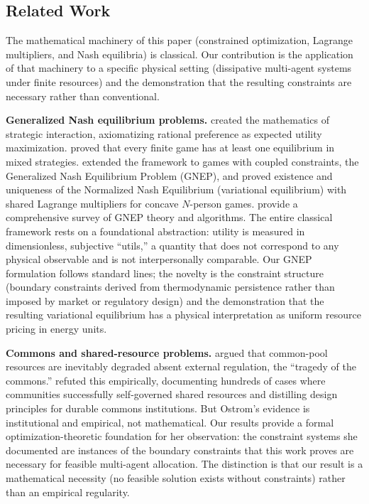 \documentclass[11pt]{article}
\theoremstyle{plain}
\theoremstyle{definition}
\theoremstyle{remark}
\let\origsubsection\subsection
\renewcommand{\subsection}{\needspace{7\baselineskip}\origsubsection}
\begin{document}
\subsection{Related Work}\label{related-work}

The mathematical machinery of this paper (constrained optimization,
Lagrange multipliers, and Nash equilibria) is classical. Our
contribution is the application of that machinery to a specific physical
setting (dissipative multi-agent systems under finite resources) and the
demonstration that the resulting constraints are necessary rather than
conventional.

\textbf{Generalized Nash equilibrium problems.} \citet{VonNeumann1944}
created the mathematics of strategic interaction, axiomatizing rational
preference as expected utility maximization. \citeauthor{Nash1950}
\citetext{\citeyear{Nash1950}; \citeyear{Nash1951}} proved that every
finite game has at least one equilibrium in mixed strategies.
\citet{Rosen1965} extended the framework to games with coupled
constraints, the Generalized Nash Equilibrium Problem (GNEP), and proved
existence and uniqueness of the Normalized Nash Equilibrium (variational
equilibrium) with shared Lagrange multipliers for concave \(N\)-person
games. \citet{Facchinei2010} provide a comprehensive survey of GNEP
theory and algorithms. The entire classical framework rests on a
foundational abstraction: utility is measured in dimensionless,
subjective ``utils,'' a quantity that does not correspond to any
physical observable and is not interpersonally comparable. Our GNEP
formulation follows standard lines; the novelty is the constraint
structure (boundary constraints derived from thermodynamic persistence
rather than imposed by market or regulatory design) and the
demonstration that the resulting variational equilibrium has a physical
interpretation as uniform resource pricing in energy units.

\textbf{Commons and shared-resource problems.} \citet{Hardin1968} argued
that common-pool resources are inevitably degraded absent external
regulation, the ``tragedy of the commons.'' \citet{Ostrom1990} refuted
this empirically, documenting hundreds of cases where communities
successfully self-governed shared resources and distilling design
principles for durable commons institutions. But Ostrom's evidence is
institutional and empirical, not mathematical. Our results provide a
formal optimization-theoretic foundation for her observation: the
constraint systems she documented are instances of the boundary
constraints that this work proves are necessary for feasible multi-agent
allocation. The distinction is that our result is a mathematical
necessity (no feasible solution exists without constraints) rather than
an empirical regularity.
\end{document}
